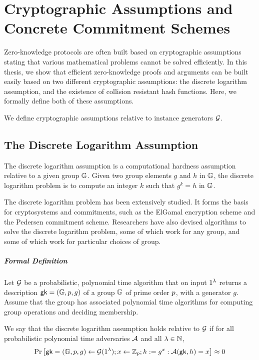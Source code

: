 \chapter{Cryptographic Assumptions and Concrete Commitment Schemes}
\label{chapterlabel:Cryptographic-Assumptions}

Zero-knowledge protocols are often built based on cryptographic assumptions stating that various mathematical problems cannot be solved efficiently. In this thesis, we show that efficient zero-knowledge proofs and arguments can be built easily based on two different cryptographic assumptions: the discrete logarithm assumption, and the existence of collision resistant hash functions. Here, we formally define both of these assumptions.

We define cryptographic assumptions relative to instance generators $\mathcal{G}$.

\section{The Discrete Logarithm Assumption}

The discrete logarithm assumption is a computational hardness assumption relative to a given group $\mathbb{G}$. Given two group elements $g$ and $h$ in $\mathbb{G}$, the discrete logarithm problem is to compute an integer $k$ such that $g^k = h$ in $\mathbb{G}$.

The discrete logarithm problem has been extensively studied. It forms the basis for cryptosystems and commitments, such as the ElGamal encryption scheme and the Pedersen commitment scheme. Researchers have also devised algorithms to solve the discrete logarithm problem, some of which work for any group, and some of which work for particular choices of group.

\paragraph{Formal Definition}

Let $\mathcal{G}$ be a probabilistic, polynomial time algorithm that on input $1^{\lambda}$ returns a description $\mathsf{gk} = (\mathbb{G},p,g)$ of a group $\mathbb{G}$ of prime order $p$, with a generator $g$. Assume that the group has associated polynomial time algorithms for computing group operations and deciding membership.

We say that the discrete logarithm assumption holds relative to $\mathcal{G}$ if for all probabilistic polynomial time adversaries $\mathcal{A}$ and all $\lambda \in \mathbb{N}$,
$$ \Pr \left[ \mathsf{gk} = (\mathbb{G},p,g) \gets \mathcal{G}(1^{\lambda}); x \gets \mathbb{Z}_{p}; h := g^x : \mathcal{A}(\mathsf{gk},h)=x \right] \approx 0 $$

